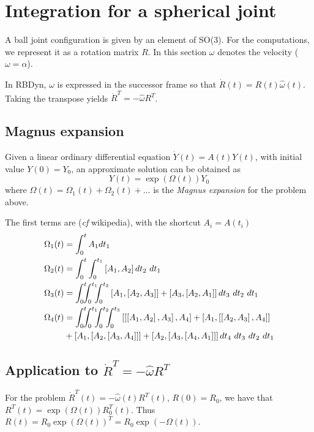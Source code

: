 \documentclass[]{article}
\newcommand{\w}{\omega}
\newcommand{\comm}[2]{\left[#1,#2\right]}
\begin{document}
\section{Integration for a spherical joint}
A ball joint configuration is given by an element of SO(3). For the computations, we represent it as a rotation matrix $R$. \newline
In this section $\w$ denotes the velocity ($\w = \alpha$).

In RBDyn, $\w$ is expressed in the successor frame so that $\dot{R}(t) = R(t) \hat{\w}(t)$. Taking the transpose yields $\dot{R}^T = - \hat{\w} R^T$.

\subsection{Magnus expansion}
Given a linear ordinary differential equation $\dot{Y}(t) = A(t) Y(t)$, with initial value $Y(0) = Y_0$, an approximate solution can be obtained as
\begin{equation}
	Y(t) = \exp(\Omega(t))Y_0
\end{equation}
where $\Omega(t) = \Omega_1(t) + \Omega_2(t) + \ldots$ is the \emph{Magnus expansion} for the problem above.

The first terms are (\emph{cf} wikipedia), with the shortcut $A_i = A(t_i)$
\begin{align}
	\Omega_1(t)& = \int_0^{t}{A_1 dt_1}\\
	\Omega_2(t)& = \int_0^{t}{\int_0^{t_1}{\comm{A_1}{A_2} dt_2}\ dt_1}\\
	\Omega_3(t)& = \int_0^{t}{\hspace{-6pt}\int_0^{t_1}{\hspace{-6pt}\int_0^{t_2}{\comm{A_1}{\comm{A_2}{A_3}} + \comm{A_3}{\comm{A_2}{A_1}} dt_3}\ dt_2}\ dt_1}\\
	\Omega_4(t)& = \int_0^{t}\hspace{-6pt}\int_0^{t_1}\hspace{-6pt}\int_0^{t_2}\hspace{-6pt}\int_0^{t_3}
		\comm{\comm{\comm{A_1}{A_2}}{A_3}}{A_4} + \comm{A_1}{\comm{\comm{A_2}{A_3}}{A_4}} \\
		& + \comm{A_1}{\comm{A_2}{\comm{A_3}{A_4}}} + \comm{A_2}{\comm{A_3}{\comm{A_4}{A_1}}}
	dt_4\ dt_3\ dt_2\ dt_1 \nonumber
\end{align}

\subsection{Application to $\dot{R}^T = - \hat{\w} R^T$}
For the problem $\dot{R}^T(t) = - \hat{\w}(t) R^T(t)$, $R(0) = R_0$, we have that $R^T(t) = \exp(\Omega(t)) R_0^T(t)$. Thus $R(t) = R_0 \exp(\Omega(t))^T = R_0  \exp(-\Omega(t))$. 
\end{document}

